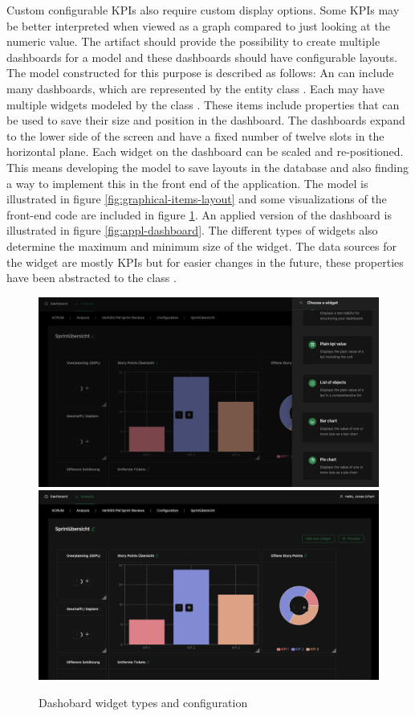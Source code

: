 Custom configurable KPIs also require custom display options. 
Some KPIs may be better interpreted when viewed as a graph compared to just looking at the numeric value. 
The artifact should provide the possibility to create multiple dashboards for a model and these dashboards should have configurable layouts. 
The model constructed for this purpose is described as follows: 
An  can include many dashboards, which are represented by the entity class . 
Each  may have multiple widgets modeled by the class . 
These items include properties that can be used to save their size and position in the dashboard. 
The dashboards expand to the lower side of the screen and have a fixed number of twelve slots in the horizontal plane. 
Each widget on the dashboard can be scaled and re-positioned. 
This means developing the model to save layouts in the database and also finding a way to implement this in the front end of the application.
The model is illustrated in figure \ref{fig:graphical-items-layout} and some visualizations of the front-end code are included in figure \ref{fig:dashboards-config}. 
An applied version of the dashboard is illustrated in figure \ref{fig:appl-dashboard}. 
The different types of widgets also determine the maximum and minimum size of the widget. 
The data sources for the widget are mostly KPIs but for easier changes in the future, these properties have been abstracted to the class .

\begin{figure}
    \centering
    \includegraphics[width=0.6\linewidth]{Figures/DashboardsConfig.png}
    \includegraphics[width=0.6\linewidth]{Figures/DashboardConfigWidgets.png}
    \caption{Dashobard widget types and configuration}
    \label{fig:dashboards-config}
\end{figure}

